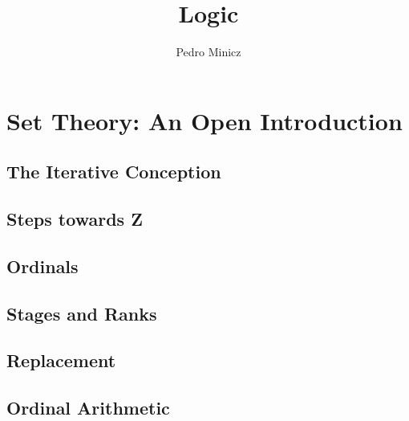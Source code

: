 \documentclass[12pt,oneside]{book}
\theoremstyle{definition}
\begin{document}
\title{Logic}
\author{Pedro Minicz}
\date{}
\maketitle

\frontmatter

\tableofcontents

\mainmatter


\part*{Set Theory: An Open Introduction}
\setcounter{chapter}{7}
\renewcommand*{\theHchapter}{01\the\value{chapter}}

\chapter{The Iterative Conception}


\chapter{Steps towards Z}


\chapter{Ordinals}


\chapter{Stages and Ranks}


\chapter{Replacement}


\chapter{Ordinal Arithmetic}

\end{document}
